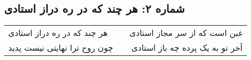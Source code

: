 \begin{center}
\section*{شماره ۲: هر چند که در ره دراز استادی}
\label{sec:002}
\begin{longtable}{l p{0.5cm} r}
هر چند که در ره دراز استادی
&&
غبن است که از سر مجاز استادی
\\
چون روح ترا نهایتی نیست پدید
&&
آخر تو به یک پرده چه باز استادی
\\
\end{longtable}
\end{center}
